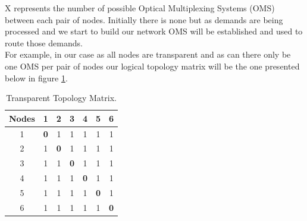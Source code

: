 X represents the number of possible Optical Multiplexing Systems (OMS) between each pair of nodes. Initially there is none but as demands are being processed and we start to build our network OMS will be established and used to route those demands.\\
For example, in our case as all nodes are transparent and as can there only be one OMS per pair of nodes our logical topology matrix will be the one presented below in figure \ref{Transparentlogical_topology}.
\begin{table}[H]
	\centering	
	\begin{tabular}{|c|c|c|c|c|c|c|}
		\hline
		\multicolumn{1}{|l|}{\textbf{Nodes}} & 1   & 2   & 3   & 4   & 5   & 6  \\ \hline
		1                           & \textbf{0}   & 1 & 1 & 1 & 1 & 1 \\ \hline
		2                           & 1 & \textbf{0}   & 1 & 1 & 1 & 1 \\ \hline
		3                           & 1 & 1 & \textbf{0}   & 1 & 1 & 1 \\ \hline
		4                           & 1 & 1 & 1 & \textbf{0}   & 1 & 1 \\ \hline
		5                           & 1 & 1 & 1 & 1 & \textbf{0}   & 1 \\ \hline
		6                           & 1 & 1 & 1 & 1 & 1 & \textbf{0}   \\ \hline
	\end{tabular}
	\caption{Transparent Topology Matrix.}
	\label{Transparentlogical_topology}
\end{table}


